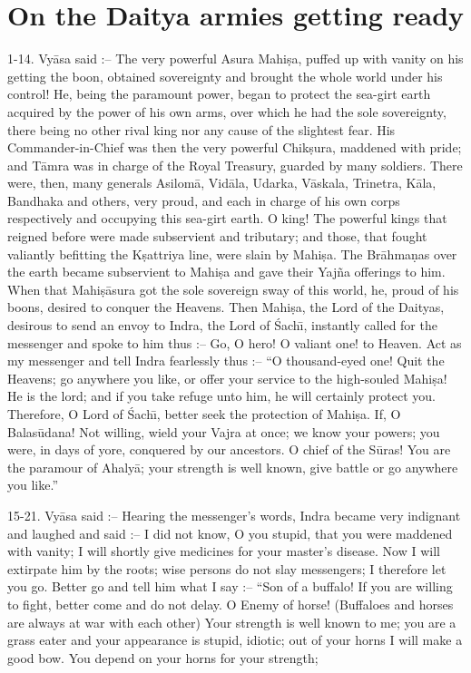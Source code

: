 \chapter{On the Daitya armies getting ready}

1-14. Vy\=asa said :-- The very powerful Asura Mahi\d{s}a, puffed up with vanity on his getting the boon, obtained sovereignty and brought the whole world under his control! He, being the paramount power, began to protect the sea-girt earth acquired by the power of his own arms, over which he had the sole sovereignty, there being no other rival king nor any cause of the slightest fear. His Commander-in-Chief was then the very powerful Chik\d{s}ura, maddened with pride; and T\=amra was in charge of the Royal Treasury, guarded by many soldiers. There were, then, many generals Asilom\=a, Vid\=ala, Udarka, V\=askala, Trinetra, K\=ala, Bandhaka and others, very proud, and each in charge of his own corps respectively and occupying this sea-girt earth. O king! The powerful kings that reigned before were made subservient and tributary; and those, that fought valiantly befitting the K\d{s}attriya line, were slain by Mahi\d{s}a. The Br\=ahma\d{n}as over the earth became subservient to Mahi\d{s}a and gave their Yaj\~na offerings to him. When that Mahi\d{s}\=asura got the sole sovereign sway of this world, he, proud of his boons, desired to conquer the Heavens. Then Mahi\d{s}a, the Lord of the Daityas, desirous to send an envoy to Indra, the Lord of \'Sach\={\i}, instantly called for the messenger and spoke to him thus :-- Go, O hero! O valiant one! to Heaven. Act as my messenger and tell Indra fearlessly thus :-- ``O thousand-eyed one! Quit the Heavens; go anywhere you like, or offer your service to the high-souled Mahi\d{s}a! He is the lord; and if you take refuge unto him, he will certainly protect you. Therefore, O Lord of \'Sach\={\i}, better seek the protection of Mahi\d{s}a. If, O Balas\=udana! Not willing, wield your Vajra at once; we know your powers; you were, in days of yore, conquered by our ancestors. O chief of the S\=uras! You are the paramour of Ahaly\=a; your strength is well known, give battle or go anywhere you like.''

15-21. Vy\=asa said :-- Hearing the messenger's words, Indra became very indignant and laughed and said :-- I did not know, O you stupid, that you were maddened with vanity; I will shortly give medicines for your master's disease. Now I will extirpate him by the roots; wise persons do not slay messengers; I therefore let you go. Better go and tell him what I say :-- ``Son of a buffalo! If you are willing to fight, better come and do not delay. O Enemy of horse! (Buffaloes and horses are always at war with each other) Your strength is well known to me; you are a grass eater and your appearance is stupid, idiotic; out of your horns I will make a good bow. You depend on your horns for your strength;

